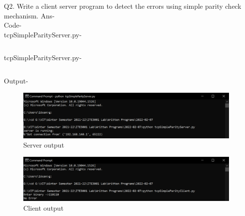 \documentclass[12pt]{article}
\begin{document}
Q2. Write a client server program to detect the errors using simple parity check mechanism. \newline
Ans- \\ Code- \\ tcpSimpleParityServer.py-\inputminted{python}{tcpSimpleParityServer.py}
tcpSimpleParityServer.py- \inputminted{python}{tcpSimpleParityServer.py}
\newpage
Output-
\begin{figure}[h] %
\centering
\includegraphics[width=\textwidth]{tcpSimpleParityServer.png}
\caption{Server output}
\end{figure}
\begin{figure}[h] %
\centering
\includegraphics[width=\textwidth]{tcpSimpleParityClient.png}
\caption{Client output}
\end{figure}
\newline
\end{document}

